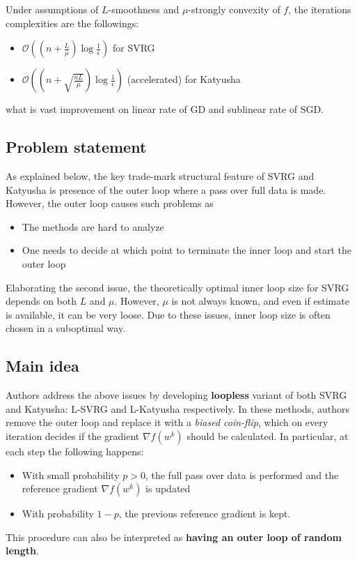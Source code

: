 \documentclass{article}
\begin{document}
Under assumptions of \(L\)-smoothness and \(\mu\)-strongly convexity
of \(f\), the iterations complexities are the followings:
\begin{itemize}
  \item \(\mathcal{O}((n+\frac{L}{\mu})\log \frac{1}{\epsilon} )\) for SVRG
  \item \(\mathcal{O}((n+\sqrt{\frac{nL}{\mu}})\log \frac{1}{\epsilon} )\)
  (accelerated) for Katyusha
\end{itemize}
what is vast improvement on linear rate of GD and sublinear rate of SGD.

\subsection{Problem statement}
As explained below, the key trade-mark structural feature of SVRG and Katyusha
is presence of the outer loop where a pass over full data is made.
However, the outer loop causes such problems as
\begin{itemize}
  \item The methods are hard to analyze
  \item One needs to decide at which point to terminate the inner loop and
  start the outer loop
\end{itemize}
Elaborating the second issue, the theoretically optimal inner loop size for SVRG
depends on both \(L\) and \(\mu\). However, \(\mu\) is not always known, and
even if estimate is available, it can be very loose. Due to these issues,
inner loop size is often chosen in a suboptimal way.

\subsection{Main idea}
Authors address the above issues by developing \textbf{loopless} variant
of both SVRG and Katyusha: L-SVRG and L-Katyusha respectively. In these methods,
authors remove the outer loop and replace it with a \textit{biased coin-flip},
which on every iteration decides if the gradient \(\nabla f(w^k)\) should be
calculated. In particular, at each step the following happens:
\begin{itemize}
  \item With small probability \(p > 0\), the full pass over data is performed and
  the reference gradient \(\nabla f(w^k)\) is updated
  \item With probability \(1-p\), the previous reference gradient is kept.
\end{itemize}
This procedure can also be interpreted as \textbf{having an outer loop of
random length}.
\end{document}
